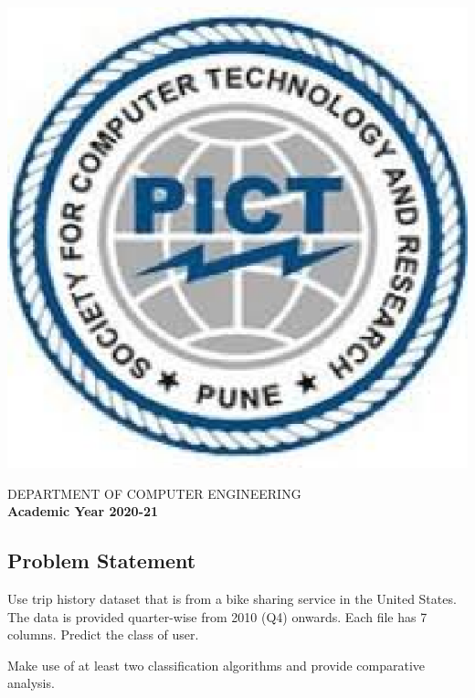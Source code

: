 \documentclass[a4paper, 12pt]{article}
\begin{document}
\begin{titlepage}
\begin{center}
        \includegraphics[scale=0.6]{pict.eps}   
        
        \Large
        DEPARTMENT OF COMPUTER ENGINEERING\\
        \textbf{Academic Year 2020-21}
        
    \end{center}
\end{titlepage}
\pagebreak

\newpage
\tableofcontents
\newpage
{}
\begin{center}
    \section{Problem Statement}
\end{center}
\par Use trip history dataset that is from a bike sharing service in the United States. The data is provided quarter-wise from 2010 (Q4) onwards. Each file has 7 columns. Predict the class of user.

\par Make use of at least two classification algorithms and provide comparative
analysis.
\end{document}
